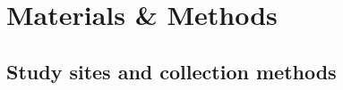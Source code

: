 \documentclass[12pt]{article}
\providecommand{\DIFdelend}{} %
\begin{document}



\DIFdelend \section*{Materials \& Methods}
\label{sec:methods}

\subsection*{Study sites and collection methods}
\label{sec:study-sites}
\end{document}
